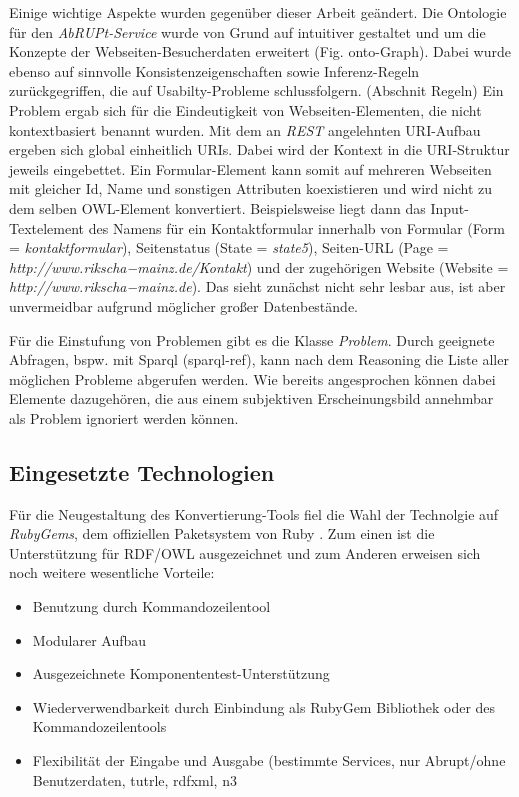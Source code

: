\documentclass[runningheads,a4paper]{llncs}
\begin{document}
Einige wichtige Aspekte wurden gegenüber dieser Arbeit geändert. 
Die Ontologie für den \textit{AbRUPt-Service} wurde von Grund auf intuitiver gestaltet und um die Konzepte der Webseiten-Besucherdaten erweitert (Fig. onto-Graph). 
Dabei wurde ebenso auf sinnvolle Konsistenzeigenschaften sowie Inferenz-Regeln zurückgegriffen, die auf Usabilty-Probleme schlussfolgern. (Abschnit Regeln)
Ein Problem ergab sich für die Eindeutigkeit von Webseiten-Elementen, die nicht kontextbasiert benannt wurden. 
Mit dem an \textit{REST} angelehnten URI-Aufbau ergeben sich global einheitlich URIs.
Dabei wird der Kontext in die URI-Struktur jeweils eingebettet. 
Ein Formular-Element kann somit auf mehreren Webseiten mit gleicher Id, Name und sonstigen Attributen koexistieren und wird nicht zu dem selben OWL-Element konvertiert. 
Beispielsweise liegt dann das Input-Textelement des Namens für ein Kontaktformular innerhalb von Formular (Form = \textit{kontaktformular}), Seitenstatus (State = \textit{state5}), Seiten-URL (Page = \textit{http://www.rikscha−mainz.de/Kontakt}) und der zugehörigen Website (Website = \textit{http://www.rikscha−mainz.de}).
Das sieht zunächst nicht sehr lesbar aus, ist aber unvermeidbar aufgrund möglicher großer Datenbestände. 

 
Für die Einstufung von Problemen gibt es die Klasse \textit{Problem}. 
Durch geeignete Abfragen, bspw. mit Sparql (sparql-ref), kann nach dem Reasoning die Liste aller möglichen Probleme abgerufen werden. 
Wie bereits angesprochen können dabei Elemente dazugehören, die aus einem subjektiven Erscheinungsbild annehmbar als Problem ignoriert werden können.

\subsection{Eingesetzte Technologien}
\label{sec:technology}

Für die Neugestaltung des Konvertierung-Tools fiel die Wahl der Technolgie auf \textit{RubyGems}, dem offiziellen Paketsystem von Ruby . 
Zum einen ist die Unterstützung \cite{ruby-rdf} für RDF/OWL ausgezeichnet und zum Anderen erweisen sich noch weitere wesentliche Vorteile:
\begin{itemize}
\item{Benutzung durch Kommandozeilentool}
\item{Modularer Aufbau}
\item{Ausgezeichnete Komponententest-Unterstützung}
\item{Wiederverwendbarkeit durch Einbindung als RubyGem Bibliothek oder des Kommandozeilentools}
\item{Flexibilität der Eingabe und Ausgabe (bestimmte Services, nur Abrupt/ohne Benutzerdaten, tutrle, rdfxml, n3}
\end{itemize}
\end{document}
